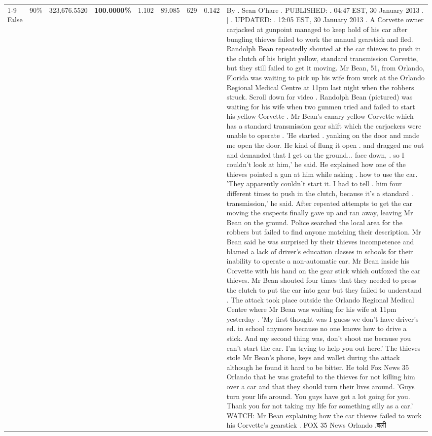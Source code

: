 \begin{table}[H]
\begin{tabular}{lllrlllll}
\cline{1-9} \cline{2-9}
False & 90\% & 323,676.5520 & \bfseries \color{red} 100.0000\% & 1.102 & 89.085 & 629 & 0.142 & By . Sean O'hare . PUBLISHED: . 04:47 EST, 30 January 2013 . | . UPDATED: . 12:05 EST, 30 January 2013 . A Corvette owner carjacked at gunpoint managed to keep hold of his car after bungling thieves failed to work the manual gearstick and fled. Randolph Bean repeatedly shouted at the car thieves to push in the clutch of his bright yellow, standard transmission Corvette, but they still failed to get it moving. Mr Bean, 51, from Orlando, Florida was waiting to pick up his wife from work at the Orlando Regional Medical Centre at 11pm last night when the robbers struck. Scroll down for video . Randolph Bean (pictured) was waiting for his wife when two gunmen tried and failed to start his yellow Corvette . Mr Bean's canary yellow Corvette which has a standard transmission gear shift which the carjackers were unable to operate . 'He started . yanking on the door and made me open the door. He kind of flung it open . and dragged me out and demanded that I get on the ground... face down, . so I couldn't look at him,' he said. He explained how one of the thieves pointed a gun at him while asking . how to use the car. 'They apparently couldn't start it. I had to tell . him four different times to push in the clutch, because it's a standard . transmission,' he said. After repeated attempts to get the car moving the suspects finally gave up and ran away, leaving Mr Bean on the ground. Police searched the local area for the robbers but failed to find anyone matching their description. Mr Bean said he was surprised by their thieves incompetence and blamed a lack of driver's education classes in schools for their inability to operate a non-automatic car. Mr Bean inside his Corvette with his hand on the gear stick which outfoxed the car thieves. Mr Bean shouted four times that they needed to press the clutch to put the car into gear but they failed to understand . The attack took place outside the Orlando Regional Medical Centre where Mr Bean was waiting for his wife at 11pm yesterday . 'My first thought was I guess we don't have driver's ed. in school anymore because no one knows how to drive a stick. And my second thing was, don't shoot me because you can't start the car. I'm trying to help you out here.' The thieves stole Mr Bean's phone, keys and wallet during the attack although he found it hard to be bitter. He told Fox News 35 Orlando that he was grateful to the thieves for not killing him over a car and that they should turn their lives around. 'Guys turn your life around. You guys have got a lot going for you. Thank you for not taking my life for something silly as a car.' WATCH: Mr Bean explaining how the car thieves failed to work his Corvette's gearstick . FOX 35 News Orlando .बली \\

\end{tabular}
\end{table}
